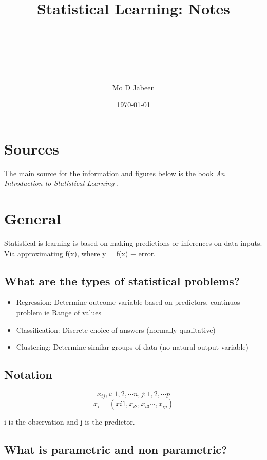 \documentclass[11pt]{scrartcl} %
\title{	
	\normalfont\normalsize
	\vspace{20pt} %
	{\huge Statistical Learning: Notes}\\ %
	\vspace{12pt} %
	\rule{\linewidth}{2pt}\\ %
}
\author{\small Mo D Jabeen} %
\date{\normalsize\today} %
\begin{document}
\maketitle %

\tableofcontents

\newpage

\section{Sources}

The main source for the information and figures below is the book \textit{An Introduction to Statistical Learning} \cite{james2013introduction}.

\section{General}

Statistical is learning is based on making predictions or inferences on data inputs. Via approximating f(x),
where y = f(x) + error.

\subsection{What are the types of statistical problems?}

\begin{itemize}
	\item Regression: Determine outcome variable based on predictors, continuos problem ie Range of values 
	\item Classification: Discrete choice of answers (normally qualitative)
	\item Clustering: Determine similar groups of data (no natural output variable)
\end{itemize}

\subsection{Notation}

\begin{equation}
	x_{ij}, i:1,2,\cdots n, j:1,2,\cdots p
\end{equation}
\begin{equation}
	x_{i} = (x{i1},x_{i2},x_{i3} \cdots,x_{ip})
\end{equation}

i is the observation and j is the predictor.

\subsection{What is parametric and non parametric?}
\end{document}
